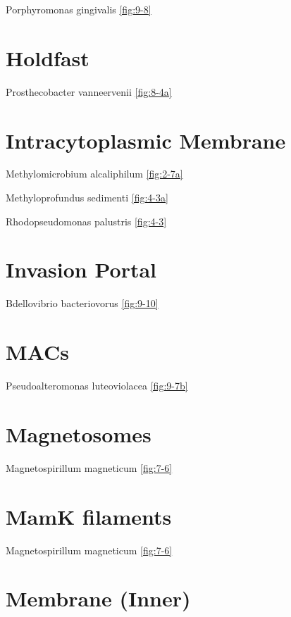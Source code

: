 \documentclass[]{tufte-book}
\begin{document}
Porphyromonas gingivalis \ref{fig:9-8}

\section*{Holdfast}\label{holdfast}

Prosthecobacter vanneervenii \ref{fig:8-4a}

\section*{Intracytoplasmic Membrane}\label{intracytoplasmic-membrane}

Methylomicrobium alcaliphilum \ref{fig:2-7a}

Methyloprofundus sedimenti \ref{fig:4-3a}

Rhodopseudomonas palustris \ref{fig:4-3}

\section*{Invasion Portal}\label{invasion-portal}

Bdellovibrio bacteriovorus \ref{fig:9-10}

\section*{MACs}\label{macs}

Pseudoalteromonas luteoviolacea \ref{fig:9-7b}

\section*{Magnetosomes}\label{magnetosomes}

Magnetospirillum magneticum \ref{fig:7-6}

\section*{MamK filaments}\label{mamk-filaments}

Magnetospirillum magneticum \ref{fig:7-6}

\section*{Membrane (Inner)}\label{membrane-inner}
\end{document}

